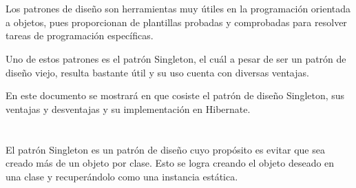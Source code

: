 \documentclass[10pt,a4paper]{article} %
\begin{document}
\section{}%
{\large Los patrones de dise{\~ n}o son herramientas muy {\' u}tiles en la programaci{\' o}n orientada a objetos, pues proporcionan de plantillas probadas y comprobadas para resolver tareas de programaci{\' o}n espec{\' i}ficas.  


\vspace{0.5cm}
Uno de estos patrones es el patr{\' o}n Singleton, el cu{\' a}l a pesar de ser un patr{\' o}n de dise{\~ n}o viejo, resulta bastante {\' u}til y su uso cuenta con diversas ventajas.


\vspace{0.5cm}
En este documento se mostrar{\' a} en que cosiste el patr{\' o}n de dise{\~ n}o Singleton, sus ventajas y desventajas y su implementaci{\' o}n en Hibernate.}

\pagebreak

\section{\color{colorIPN}{Desarrollo}}
{\large El patr{\' o}n Singleton es un patr{\' o}n de dise{\~ n}o cuyo prop{\' o}sito es evitar que sea creado m{\' a}s de un objeto por clase. Esto se logra creando el objeto deseado en una clase y recuper{\' a}ndolo como una instancia est{\' a}tica.}

\end{document}
